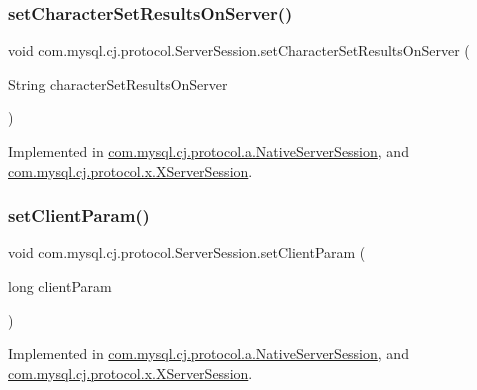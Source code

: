 \subsubsection{\texorpdfstring{set\+Character\+Set\+Results\+On\+Server()}{setCharacterSetResultsOnServer()}}
{\footnotesize\ttfamily void com.\+mysql.\+cj.\+protocol.\+Server\+Session.\+set\+Character\+Set\+Results\+On\+Server (\begin{DoxyParamCaption}\item[{String}]{character\+Set\+Results\+On\+Server }\end{DoxyParamCaption})}



Implemented in \mbox{\hyperlink{classcom_1_1mysql_1_1cj_1_1protocol_1_1a_1_1_native_server_session_a8b4347b3013dbe54d67b318815008340}{com.\+mysql.\+cj.\+protocol.\+a.\+Native\+Server\+Session}}, and \mbox{\hyperlink{classcom_1_1mysql_1_1cj_1_1protocol_1_1x_1_1_x_server_session_a53a07197cb0512e9b74ddd1e4478dbb8}{com.\+mysql.\+cj.\+protocol.\+x.\+X\+Server\+Session}}.

\mbox{\label{interfacecom_1_1mysql_1_1cj_1_1protocol_1_1_server_session_a25a797b7b770b843dfad239426ca0621}} 
\subsubsection{\texorpdfstring{set\+Client\+Param()}{setClientParam()}}
{\footnotesize\ttfamily void com.\+mysql.\+cj.\+protocol.\+Server\+Session.\+set\+Client\+Param (\begin{DoxyParamCaption}\item[{long}]{client\+Param }\end{DoxyParamCaption})}



Implemented in \mbox{\hyperlink{classcom_1_1mysql_1_1cj_1_1protocol_1_1a_1_1_native_server_session_a6b2f480c08fa965e6559157f71a86970}{com.\+mysql.\+cj.\+protocol.\+a.\+Native\+Server\+Session}}, and \mbox{\hyperlink{classcom_1_1mysql_1_1cj_1_1protocol_1_1x_1_1_x_server_session_a5ec8909cbdcc47372fd091f4d7e4e786}{com.\+mysql.\+cj.\+protocol.\+x.\+X\+Server\+Session}}.

